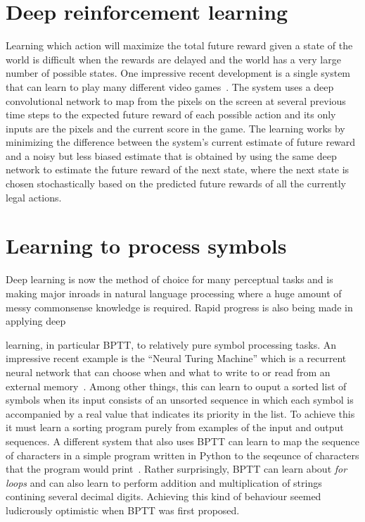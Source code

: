 \documentclass[]{article}
\begin{document}
\section{Deep reinforcement learning}

Learning which action will maximize the total future reward given a state
of the world is difficult when the rewards are delayed and the world has a
very large number of possible states. One impressive recent development is
a single system that can learn to play many different video
games~\cite{NatureAtari}. The system uses a deep convolutional network to
map from the pixels on the screen at several previous time steps to the
expected future reward of each possible action and its only inputs are the
pixels and the current score in the game. The learning works by minimizing
the difference between the system's current estimate of future reward and a
noisy but less biased estimate that is obtained by using the same deep
network to estimate the future reward of the next state, where the next
state is chosen stochastically based on the predicted future rewards of all
the currently legal actions.

\section{Learning to process symbols}

Deep learning is now the method of choice for many perceptual tasks and is
making major inroads in natural language processing where a huge amount of
messy commonsense knowledge is required. Rapid progress is also being made
in applying deep

learning, in particular BPTT, to relatively pure symbol processing tasks.
An impressive recent example is the ``Neural Turing Machine'' which is a
recurrent neural network that can choose when and what to write to or read
from an external memory~\cite{NTM}. Among other things, this can learn to
ouput a sorted list of symbols when its input consists of an unsorted
sequence in which each symbol is accompanied by a real value that indicates
its priority in the list.  To achieve this it must learn a sorting program
purely from examples of the input and output sequences.  A different system
that also uses BPTT can learn to map the sequence of characters in a simple
program written in Python to the seqeunce of characters that the program
would print~\cite{Woj}. Rather surprisingly, BPTT can learn about {\it for
  loops} and can also learn to perform addition and multiplication of
strings contining several decimal digits. Achieving this kind of behaviour
seemed ludicrously optimistic when BPTT was first proposed.
  
\end{document}
